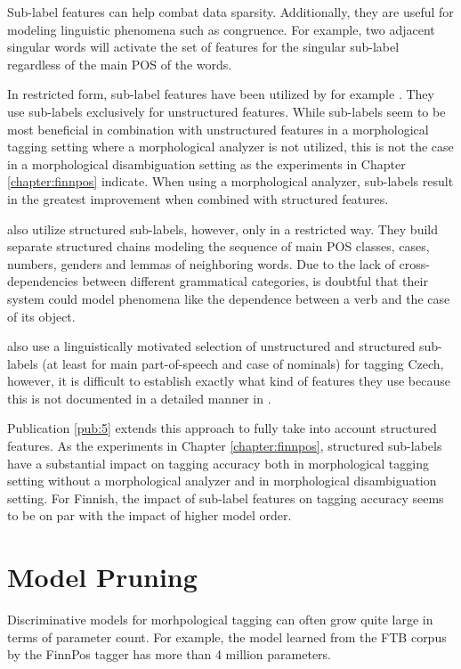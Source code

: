 Sub-label features can help combat data sparsity. Additionally, they
are useful for modeling linguistic phenomena such as congruence. For
example, two adjacent singular words will activate the set of features
for the singular sub-label regardless of the main POS of the words.

In restricted form, sub-label features have been utilized by for
example \cite{Muller2013}. They use sub-labels
exclusively for unstructured features. While sub-labels seem to be
most beneficial in combination with unstructured features in a
morphological tagging setting where a morphological analyzer is not
utilized, this is not the case in a morphological disambiguation
setting as the experiments in Chapter \ref{chapter:finnpos}
indicate. When using a morphological analyzer, sub-labels result in
the greatest improvement when combined with structured features.

\cite{Smith2005} also utilize structured sub-labels, however, only in
a restricted way. They build separate structured chains modeling the
sequence of main POS classes, cases, numbers, genders and lemmas of
neighboring words. Due to the lack of cross-dependencies between
different grammatical categories, is doubtful that their system could
model phenomena like the dependence between a verb and the case of its
object. 

\cite{Spoustova2009} also use a linguistically motivated selection of
unstructured and structured sub-labels (at least for main
part-of-speech and case of nominals) for tagging Czech, however, it is
difficult to establish exactly what kind of features they use because
this is not documented in a detailed manner in \cite{Spoustova2009}.
 
Publication \ref{pub:5} extends this approach to fully take
into account structured features. As the experiments in Chapter
\ref{chapter:finnpos}, structured sub-labels have a substantial impact
on tagging accuracy both in morphological tagging setting without a
morphological analyzer and in morphological disambiguation
setting. For Finnish, the impact of sub-label features on tagging
accuracy seems to be on par with the impact of higher model order.

\section{Model Pruning}\label{sec:pruning}

Discriminative models for morhpological tagging can often grow quite
large in terms of parameter count. For example, the model learned from
the FTB corpus by the FinnPos tagger has more than 4 million
parameters.

